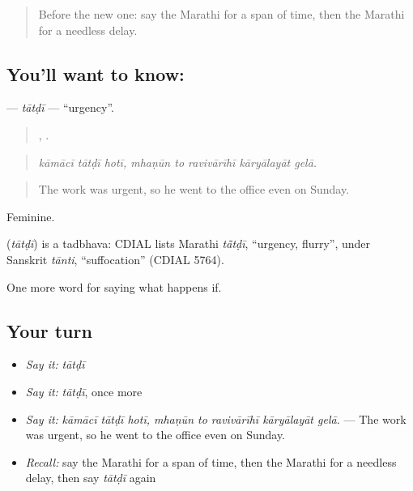 \label{lesson:MR-C555-tatdi}



\begin{quote}
Before the new one: say the Marathi for a span of time, then the Marathi for a needless delay.
\end{quote}

\subsection*{You'll want to know: }
\textbf{} — \emph{tātḍī} — \textquotedblleft{}urgency\textquotedblright{}.

\begin{quote}
  ,     .
\end{quote}

\begin{quote}
\emph{kāmācī tātḍī hotī, mhaṇūn to ravivārīhī kāryālayāt gelā.}
\end{quote}

\begin{quote}
The work was urgent, so he went to the office even on Sunday.
\end{quote}

Feminine.

\begin{cousinweb}
\textbf{} (\emph{tātḍī}) is a tadbhava: CDIAL lists Marathi \emph{tā̃tḍī}, \textquotedblleft{}urgency, flurry\textquotedblright{}, under Sanskrit \emph{tānti}, \textquotedblleft{}suffocation\textquotedblright{} (CDIAL 5764).
\end{cousinweb}

\begin{grammarlens}[title={What you've built}]
One more word for saying what happens if.
\end{grammarlens}

\subsection*{Your turn}
\begin{itemize}
\raggedright
  \item \emph{Say it:} \emph{tātḍī}
  \item \emph{Say it:} \emph{tātḍī}, once more
  \item \emph{Say it:} \emph{kāmācī tātḍī hotī, mhaṇūn to ravivārīhī kāryālayāt gelā.} — The work was urgent, so he went to the office even on Sunday.
  \item \emph{Recall:} say the Marathi for a span of time, then the Marathi for a needless delay, then say \emph{tātḍī} again
\end{itemize}

